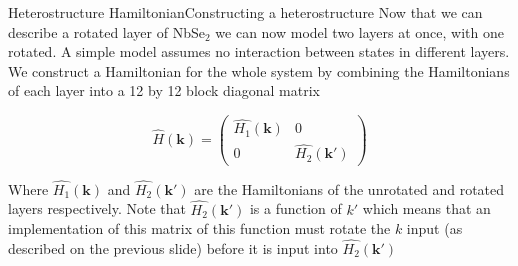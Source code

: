 \documentclass[9pt]{beamer}
\begin{document}
\begin{frame}{Heterostructure Hamiltonian}{Constructing a heterostructure}
  Now that we can describe a rotated layer of NbSe$_2$ we can now model two layers at once, with one rotated. A simple model assumes no interaction between states in different layers. We construct a Hamiltonian for the whole system by combining the Hamiltonians of each layer into a 12 by 12 block diagonal matrix

  \begin{equation}
    \hat{H}(\boldsymbol{k})=\left(\begin{array}{cc}
      \hat{H_1}(\boldsymbol{k}) & 0\\
      0 & \hat{H_2}(\boldsymbol{k'})
    \end{array}\right)
  \end{equation}

  Where $\hat{H_1}(\boldsymbol{k})$ and $\hat{H_2}(\boldsymbol{k'})$ are the Hamiltonians of the unrotated and rotated layers respectively. Note that $\hat{H_2}(\boldsymbol{k'})$ is a function of $k'$ which means that an implementation of this matrix of this function must rotate the $k$ input (as described on the previous slide) before it is input into $\hat{H_2}(\boldsymbol{k'})$
\end{frame}
\end{document}
